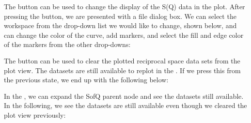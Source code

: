 The  button can be used to change the display of the S(Q) data in the plot. After pressing the  button, we are presented with a file dialog box. We can select the workspace from the drop-down list we would like to change, shown below, and can change the color of the curve, add markers, and select the fill and edge color of the markers from the other drop-downs: 

\noindent{}

The  button can be used to clear the plotted reciprocal space data sets from the plot view. The datasets are still available to replot in the . If we press this from the previous state, we end up with the following below:

\noindent{}

In the , we can expand the SofQ parent node and see the datasets still available. In the following, we see the datasets are still available even though we cleared the plot view previously:

